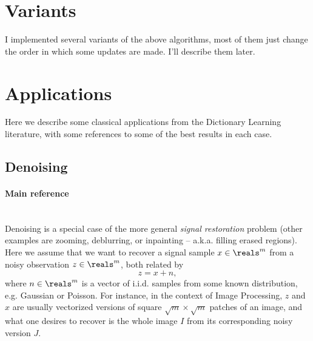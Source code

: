 \documentclass[a4paper,11pt]{article}
\begin{document}
\section{Variants}

I implemented several variants of the above algorithms, most of them just change the order in which some updates are made. I'll describe them later.

\section{Applications}

Here we describe some classical applications from the Dictionary Learning literature, with some references to some of the best results in each case.

\subsection{Denoising}

\paragraph{Main reference} \cite{ksvd}\\

Denoising is a special case of the more general \emph{signal restoration} problem (other examples are zooming, deblurring, or inpainting -- a.k.a. filling erased regions). Here we assume that we want to recover a signal sample $x \in \reals^{m}$ from a noisy observation $z \in \reals^{m}$, both related by
\[
z = x + n,
\]
where $n \in \reals^m$ is a vector of i.i.d. samples from some known distribution, e.g. Gaussian or Poisson. For instance, in the context of Image Processing, $z$ and $x$ are usually vectorized versions of square $\sqrt{m}\times\sqrt{m}$ patches of an image, and what one desires to recover is the whole image $I$ from its corresponding noisy version $J$.
\end{document}
